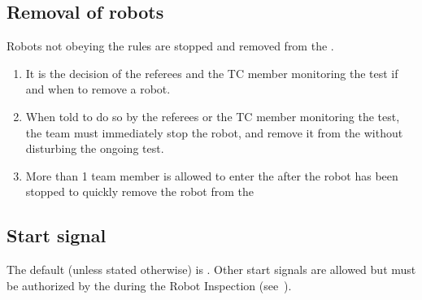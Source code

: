 \subsection{Removal of robots}
\label{rule:robot_removal}
Robots not obeying the rules are stopped and removed from the \Arena{}.
\begin{enumerate}
	\item It is the decision of the referees and the TC member monitoring the test if and when to remove a robot.

	\item When told to do so by the referees or the TC member monitoring the test, the team must immediately stop the robot, and remove it from the \Arena{} without disturbing the ongoing test.
	
	\item More than 1 team member is allowed to enter the \Arena{} after the robot has been stopped to quickly remove the robot from the \Arena{}

\end{enumerate}


\subsection{Start signal}
\label{rule:start_signal}
The default  (unless stated otherwise) is .
Other start signals are allowed but must be authorized by the  during the Robot Inspection (see~).

